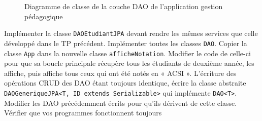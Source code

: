 \documentclass[a4paper,11pt]{article}
\begin{document}
\begin{figure}\centering\footnotesize
{}
\caption{Diagramme de classe de la couche DAO de l'application gestion pédagogique\label{dao_gestion_peda}}
\end{figure}

\Question
Implémenter la classe \texttt{DAOEtudiantJPA} devant rendre les mêmes services que celle développé dans le TP précédent.  
\Question
Implémenter toutes les classes \texttt{DAO}. 
\Question
Copier la classe \texttt{App} dans la nouvelle classe \texttt{afficheNotation}. 
Modifier le code de celle-ci pour que sa boucle principale récupère tous les étudiants de deuxième année, les affiche, puis 
affiche tous ceux qui ont été notés en « ACSI ».
\Question
L'écriture des opérations CRUD des DAO étant toujours identique, écrire la classe abstraite 
\texttt{DAOGeneriqueJPA<T, ID extends Serializable>} qui implémente \texttt{DAO<T>}. Modifier les DAO précédemment écrits 
pour qu'ils dérivent de cette classe. Vérifier que vos programmes fonctionnent toujours
\end{document}
